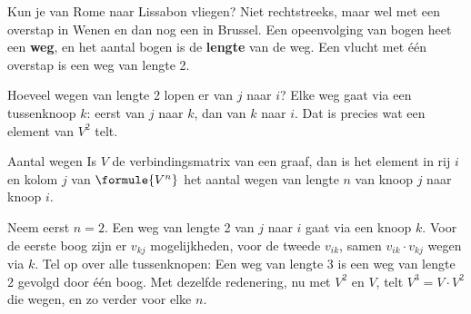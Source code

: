 Kun je van Rome naar Lissabon vliegen? Niet rechtstreeks, maar wel met een overstap in Wenen en dan nog een in Brussel. Een opeenvolging van bogen heet een \textbf{weg}, en het aantal bogen is de \textbf{lengte} van de weg. Een vlucht met één overstap is een weg van lengte 2.

Hoeveel wegen van lengte 2 lopen er van $j$ naar $i$? Elke weg gaat via een tussenknoop $k$: eerst van $j$ naar $k$, dan van $k$ naar $i$. Dat is precies wat een element van $V^2$ telt.

\begin{theorie}
\begin{stelling}{Aantal wegen}
Is $V$ de verbindingsmatrix van een graaf, dan is het element in rij $i$ en kolom $j$ van $\formule{V^n}$ het aantal wegen van lengte $n$ van knoop $j$ naar knoop $i$.
\end{stelling}

\begin{bewijs}
Neem eerst $n = 2$. Een weg van lengte 2 van $j$ naar $i$ gaat via een knoop $k$. Voor de eerste boog zijn er $v_{kj}$ mogelijkheden, voor de tweede $v_{ik}$, samen $v_{ik} \cdot v_{kj}$ wegen via $k$. Tel op over alle tussenknopen:
Een weg van lengte 3 is een weg van lengte 2 gevolgd door één boog. Met dezelfde redenering, nu met $V^2$ en $V$, telt $V^3 = V \cdot V^2$ die wegen, en zo verder voor elke $n$.
\end{bewijs}
\end{theorie}


